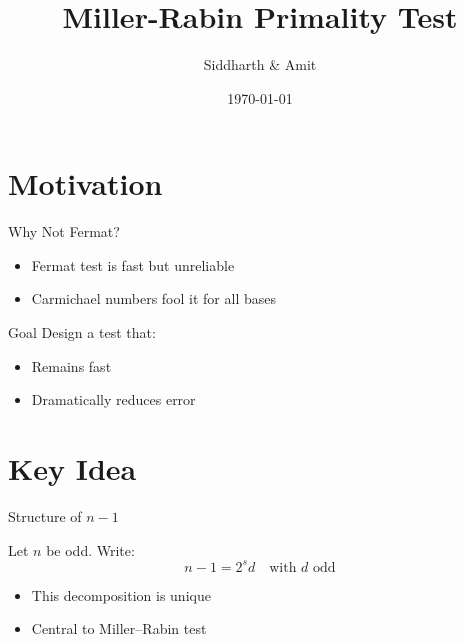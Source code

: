 \documentclass{beamer}
\title{Miller-Rabin Primality Test}
\author{Siddharth \& Amit}
\date{\today}
\begin{document}
\maketitle

\section{Motivation}

\begin{frame}{Why Not Fermat?}

\begin{itemize}
    \item Fermat test is fast but unreliable
    \item Carmichael numbers fool it for all bases
\end{itemize}

\vspace{1em}

\begin{block}{Goal}
Design a test that:
\begin{itemize}
    \item Remains fast
    \item Dramatically reduces error
\end{itemize}
\end{block}

\end{frame}

\section{Key Idea}

\begin{frame}{Structure of $n-1$}

Let $n$ be odd. Write:
\[
n-1 = 2^s d \quad \text{with } d \text{ odd}
\]

\vspace{1em}

\begin{itemize}
    \item This decomposition is unique
    \item Central to Miller--Rabin test
\end{itemize}

\end{frame}

\end{document}
